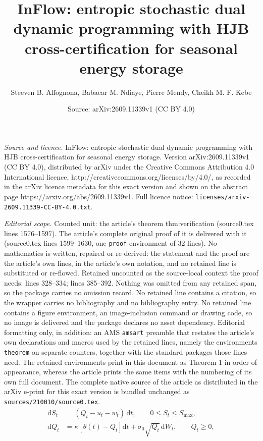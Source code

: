 \documentclass[10pt,a4paper]{amsart}
\title{InFlow: entropic stochastic dual dynamic programming with HJB cross-certification for seasonal energy storage}
\author{Steeven B. Affognona, Babacar M. Ndiaye, Pierre Mendy, Cheikh M. F. Kebe}
\date{Source: arXiv:2609.11339v1 (CC BY 4.0)}
\newcommand{\dif}{\mathrm{d}}
\begin{document}
\maketitle

\noindent\emph{Source and licence.} InFlow: entropic stochastic dual dynamic programming with HJB cross-certification for seasonal energy storage. Version arXiv:2609.11339v1 (CC BY 4.0), distributed by arXiv under the Creative Commons Attribution 4.0 International licence, http://creativecommons.org/licenses/by/4.0/, as recorded in the arXiv licence metadata for this exact version and shown on the abstract page https://arxiv.org/abs/2609.11339v1. Full licence notice: \texttt{licenses/arxiv-2609.11339-CC-BY-4.0.txt}.\par\smallskip

\noindent\textit{Editorial scope.} Counted unit: the article's theorem thm:verification (source0.tex lines 1576--1597). The article's complete original proof of it is delivered with it (source0.tex lines 1599--1630, one \texttt{proof} environment of 32 lines). No mathematics is written, repaired or re-derived: the statement and the proof are the article's own lines, in the article's own notation, and no retained line is substituted or re-flowed.  Retained uncounted as the source-local context the proof needs: lines 328--334; lines 385--392.  Nothing was omitted from any retained span, so the package carries no omission record.  No retained line contains a citation, so the wrapper carries no bibliography and no bibliography entry.  No retained line contains a figure environment, an image-inclusion command or drawing code, so no image is delivered and the package declares no asset dependency.  Editorial formatting only, in addition: an AMS \texttt{amsart} preamble that restates the article's own declarations and macros used by the retained lines, namely the environments \texttt{theorem} on separate counters, together with the standard packages those lines need.  The retained environments print in this document as Theorem 1 in order of appearance, whereas the article prints the same items with the numbering of its own full document.  The complete native source of the article as distributed in the arXiv e-print for this exact version is bundled unchanged as \texttt{sources/210010/source0.tex}.
\begin{align}
\dif S_t &= (Q_t - u_t - w_t)\,\dif t, \qquad 0 \le S_t \le S_{\max},
\label{eq:stor}\\
\dif Q_t &= \kappa\left[\theta(t) - Q_t\right]\dif t
 + \sigma_0 \sqrt{Q_t}\,\dif W_t, \qquad Q_t \ge 0,
\label{eq:cir}
\end{align}
\end{document}
